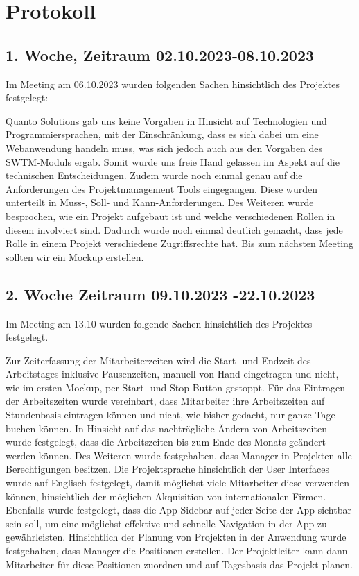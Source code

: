 \documentclass{article}
\begin{document}
\newpage

\section{Protokoll}
    \subsection{1. Woche, Zeitraum 02.10.2023-08.10.2023}
    Im Meeting am  06.10.2023 wurden folgenden Sachen hinsichtlich des Projektes festgelegt: 
    
    Quanto Solutions gab uns keine Vorgaben in Hinsicht auf Technologien und Programmiersprachen, mit der Einschränkung, dass es sich dabei um eine Webanwendung handeln muss, was sich jedoch auch aus den Vorgaben des SWTM-Moduls ergab. Somit wurde uns freie Hand gelassen im Aspekt auf die technischen Entscheidungen. Zudem wurde noch einmal genau auf die Anforderungen des Projektmanagement Tools eingegangen. Diese wurden unterteilt in Muss-, Soll- und Kann-Anforderungen. Des Weiteren wurde besprochen, wie ein Projekt aufgebaut ist und welche verschiedenen Rollen in diesem involviert sind. Dadurch wurde noch einmal deutlich gemacht, dass jede Rolle in einem Projekt verschiedene Zugriffsrechte hat.  Bis zum nächsten Meeting sollten wir ein Mockup erstellen.

    \subsection{2. Woche Zeitraum 09.10.2023 -22.10.2023}
    Im Meeting am 13.10 wurden folgende Sachen hinsichtlich des Projektes festgelegt.
    
    Zur Zeiterfassung der Mitarbeiterzeiten wird die Start- und Endzeit des Arbeitstages inklusive Pausenzeiten, manuell von Hand eingetragen und nicht, wie im ersten Mockup, per Start- und Stop-Button gestoppt. Für das Eintragen der Arbeitszeiten wurde vereinbart, dass Mitarbeiter ihre Arbeitszeiten auf Stundenbasis eintragen können und nicht, wie bisher gedacht, nur ganze Tage buchen können. In Hinsicht auf das nachträgliche Ändern von Arbeitszeiten wurde festgelegt, dass die Arbeitszeiten bis zum Ende des Monats geändert werden können.
    Des Weiteren wurde festgehalten, dass Manager in Projekten alle Berechtigungen besitzen. Die Projektsprache hinsichtlich der User Interfaces wurde auf Englisch festgelegt, damit möglichst viele Mitarbeiter diese verwenden können, hinsichtlich der möglichen Akquisition von internationalen Firmen. Ebenfalls wurde festgelegt, dass die App-Sidebar auf jeder Seite der App sichtbar sein soll, um eine möglichst effektive und schnelle Navigation in der App zu gewährleisten.
    Hinsichtlich der Planung von Projekten in der Anwendung wurde festgehalten, dass Manager die Positionen erstellen. Der Projektleiter kann dann Mitarbeiter für diese Positionen zuordnen und auf Tagesbasis das Projekt planen.
\end{document}
